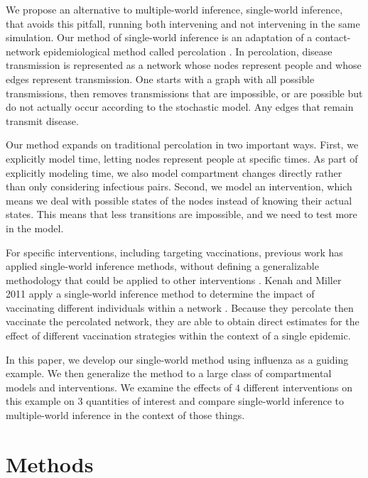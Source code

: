 \documentclass[openacc]{rsproca_new}%
\begin{document}
We propose an alternative to multiple-world inference, single-world inference, that avoids this pitfall, running both intervening and not intervening in the same simulation.
Our method of single-world inference is an adaptation of a contact-network epidemiological method called percolation \cite{miller-book}.
In percolation, disease transmission is represented as a network whose nodes represent people and whose edges represent transmission.
One starts with a graph with all possible transmissions, then removes transmissions that are impossible, or are possible but do not actually occur according to the stochastic model.
Any edges that remain transmit disease.

Our method expands on traditional percolation in two important ways.
First, we explicitly model time, letting nodes represent people at specific times.
As part of explicitly modeling time, we also model compartment changes directly rather than only considering infectious pairs.
Second, we model an intervention, which means we deal with possible states of the nodes instead of knowing their actual states.
This means that less transitions are impossible, and we need to test more in the model. %

For specific interventions, including targeting vaccinations, previous work has applied single-world inference methods, without defining a generalizable methodology that could be applied to other interventions \cite{kenah-miller:2011}.
Kenah and Miller 2011 apply a single-world inference method to determine the impact of vaccinating different individuals within a network \cite{kenah-miller:2011}.
Because they percolate then vaccinate the percolated network, they are able to obtain direct estimates for the effect of different vaccination strategies within the context of a single epidemic.

In this paper, we develop our single-world method using influenza as a guiding example.
We then generalize the method to a large class of compartmental models and interventions.
We examine the effects of $4$ different interventions on this example on $3$ quantities of interest and compare single-world inference to multiple-world inference in the context of those things.


\section{Methods}
\end{document}

